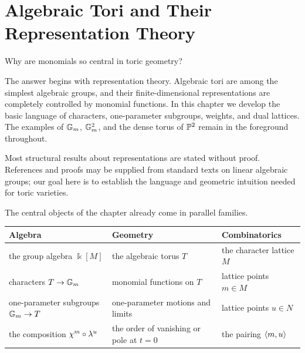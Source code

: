 \chapter[Algebraic Tori and Their Representation Theory]
{Algebraic Tori and Their\\ Representation Theory}
\label{chap:algebraic-tori}

\begin{chapteroverview}
Why are monomials so central in toric geometry?

The answer begins with representation theory. Algebraic tori are among
the simplest algebraic groups, and their finite-dimensional
representations are completely controlled by monomial functions. In
this chapter we develop the basic language of characters,
one-parameter subgroups, weights, and dual lattices. The examples of
\(\mathbb{G}_{m}\), \(\mathbb{G}_{m}^2\), and the dense torus of \(\mathbb{P}^2\) remain in the
foreground throughout.

Most structural results about representations are stated without
proof. References and proofs may be supplied from standard texts on
linear algebraic groups; our goal here is to establish the language
and geometric intuition needed for toric varieties.
\end{chapteroverview}

\begin{threedictionaries}
The central objects of the chapter already come in parallel families.

\medskip

\begin{center}
\small
\begin{tabularx}{\linewidth}{@{}
  >{\raggedright\arraybackslash}X
  >{\raggedright\arraybackslash}X
  >{\raggedright\arraybackslash}X@{}}
\toprule
\textbf{Algebra}
&
\textbf{Geometry}
&
\textbf{Combinatorics}
\\
\midrule
the group algebra \(\Bbbk[M]\)
&
the algebraic torus \(T\)
&
the character lattice \(M\)
\\[1mm]
characters \(T\to\mathbb{G}_{m}\)
&
monomial functions on \(T\)
&
lattice points \(m\in M\)
\\[1mm]
one-parameter subgroups \(\mathbb{G}_{m}\to T\)
&
one-parameter motions and limits
&
lattice points \(u\in N\)
\\[1mm]
the composition
\(\chi^{m}\circ\lambda^{u}\)
&
the order of vanishing or pole at \(t=0\)
&
the pairing \(\left\langle m,u\right\rangle\)
\\
\bottomrule
\end{tabularx}
\end{center}
\end{threedictionaries}

